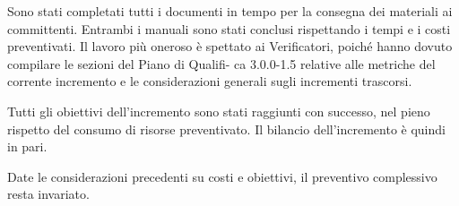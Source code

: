 Sono stati completati tutti i documenti in tempo per la consegna dei materiali ai committenti. Entrambi i manuali sono stati conclusi rispettando i tempi e i costi preventivati. Il lavoro più oneroso è spettato ai Verificatori, poiché hanno dovuto compilare le sezioni del Piano di Qualifi- ca 3.0.0-1.5 relative alle metriche del corrente incremento e le considerazioni generali sugli incrementi trascorsi.

Tutti gli obiettivi dell’incremento sono stati raggiunti con successo, nel pieno rispetto del consumo di risorse preventivato. Il bilancio dell’incremento è quindi in pari.

Date le considerazioni precedenti su costi e obiettivi, il preventivo complessivo resta invariato.


\pagebreak




